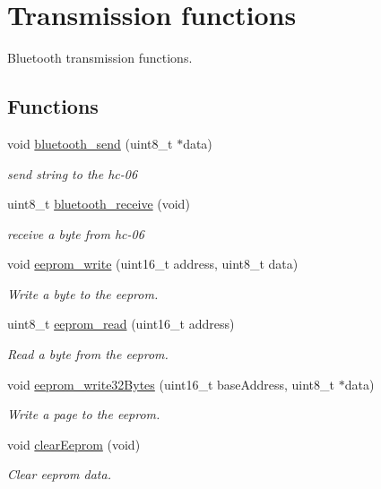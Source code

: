 \hypertarget{group___transmission}{}\section{Transmission functions}
\label{group___transmission}


Bluetooth transmission functions.  


\subsection*{Functions}
\begin{DoxyCompactItemize}
\item 
void \hyperlink{group___transmission_ga31d829d5658369ee2c90b9c3cdbedfe1}{bluetooth\+\_\+send} (uint8\+\_\+t $\ast$data)
\begin{DoxyCompactList}\small\item\em send string to the hc-\/06 \end{DoxyCompactList}\item 
uint8\+\_\+t \hyperlink{group___transmission_gab7ad1e1b94cf1cedc8a8e5151b0e25cb}{bluetooth\+\_\+receive} (void)
\begin{DoxyCompactList}\small\item\em receive a byte from hc-\/06 \end{DoxyCompactList}\item 
void \hyperlink{group___transmission_ga11e27abf76759a5907ef18d1351aecdb}{eeprom\+\_\+write} (uint16\+\_\+t address, uint8\+\_\+t data)
\begin{DoxyCompactList}\small\item\em Write a byte to the eeprom. \end{DoxyCompactList}\item 
uint8\+\_\+t \hyperlink{group___transmission_gafaa7cca6f6ad1d9ae49522324c825c2f}{eeprom\+\_\+read} (uint16\+\_\+t address)
\begin{DoxyCompactList}\small\item\em Read a byte from the eeprom. \end{DoxyCompactList}\item 
void \hyperlink{group___transmission_ga4f1a1c3f7642565b9dbff6bfd2e7ed0d}{eeprom\+\_\+write32\+Bytes} (uint16\+\_\+t base\+Address, uint8\+\_\+t $\ast$data)
\begin{DoxyCompactList}\small\item\em Write a page to the eeprom. \end{DoxyCompactList}\item 
void \hyperlink{group___transmission_ga22e1179dc9f78a6771b2ae3f2e246595}{clear\+Eeprom} (void)
\begin{DoxyCompactList}\small\item\em Clear eeprom data. \end{DoxyCompactList}\end{DoxyCompactItemize}


